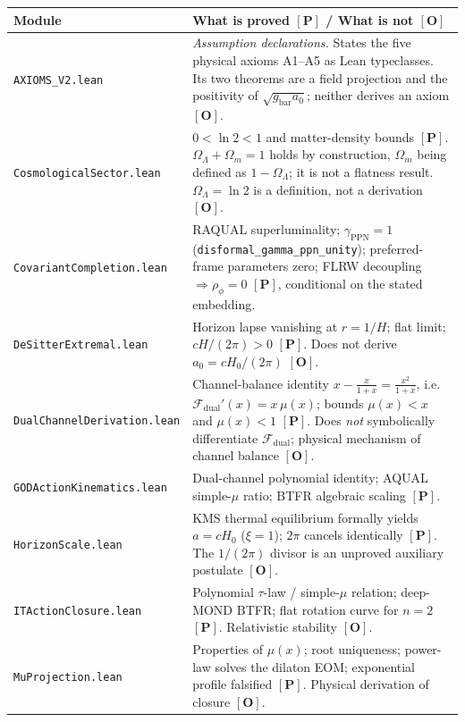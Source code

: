 \documentclass[aps,prd,preprint,superscriptaddress,nofootinbib,amsmath,amssymb,floatfix]{revtex4-2}
\begin{document}
\begin{table}[t]
\centering
\footnotesize
\begin{tabularx}{\textwidth}{@{}l X@{}}
\toprule
\textbf{Module} & \textbf{What is proved $\mathbf{[P]}$ / What is not $\mathbf{[O]}$} \\
\midrule
\texttt{AXIOMS\_V2.lean} & \emph{Assumption declarations.} States the five physical axioms A1--A5 as Lean typeclasses. Its two theorems are a field projection and the positivity of $\sqrt{g_{\text{bar}}a_0}$; neither derives an axiom $\mathbf{[O]}$. \\
\texttt{CosmologicalSector.lean} & $0 < \ln 2 < 1$ and matter-density bounds $\mathbf{[P]}$. $\Omega_\Lambda + \Omega_m = 1$ holds by construction, $\Omega_m$ being defined as $1-\Omega_\Lambda$; it is not a flatness result. $\Omega_\Lambda = \ln 2$ is a definition, not a derivation $\mathbf{[O]}$. \\
\texttt{CovariantCompletion.lean} & RAQUAL superluminality; $\gamma_{\text{PPN}} = 1$ (\texttt{disformal\_gamma\_ppn\_unity}); preferred-frame parameters zero; FLRW decoupling $\Rightarrow \rho_\phi = 0$ $\mathbf{[P]}$, conditional on the stated embedding. \\
\texttt{DeSitterExtremal.lean} & Horizon lapse vanishing at $r = 1/H$; flat limit; $cH/(2\pi) > 0$ $\mathbf{[P]}$. Does not derive $a_0 = cH_0/(2\pi)$ $\mathbf{[O]}$. \\
\texttt{DualChannelDerivation.lean} & Channel-balance identity $x - \tfrac{x}{1+x} = \tfrac{x^2}{1+x}$, i.e. $\mathcal{F}_{\text{dual}}'(x) = x\,\mu(x)$; bounds $\mu(x) < x$ and $\mu(x) < 1$ $\mathbf{[P]}$. Does \emph{not} symbolically differentiate $\mathcal{F}_{\text{dual}}$; physical mechanism of channel balance $\mathbf{[O]}$. \\
\texttt{GODActionKinematics.lean} & Dual-channel polynomial identity; AQUAL simple-$\mu$ ratio; BTFR algebraic scaling $\mathbf{[P]}$. \\
\texttt{HorizonScale.lean} & KMS thermal equilibrium formally yields $a = cH_0$ ($\xi = 1$); $2\pi$ cancels identically $\mathbf{[P]}$. The $1/(2\pi)$ divisor is an unproved auxiliary postulate $\mathbf{[O]}$. \\
\texttt{ITActionClosure.lean} & Polynomial $\tau$-law / simple-$\mu$ relation; deep-MOND BTFR; flat rotation curve for $n=2$ $\mathbf{[P]}$. Relativistic stability $\mathbf{[O]}$. \\
\texttt{MuProjection.lean} & Properties of $\mu(x)$; root uniqueness; power-law solves the dilaton EOM; exponential profile falsified $\mathbf{[P]}$. Physical derivation of closure $\mathbf{[O]}$. \\

\end{tabularx}
\end{table}
\end{document}
